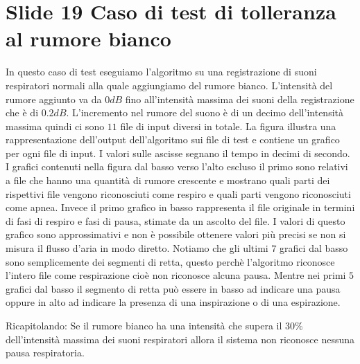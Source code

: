 \section{Slide 19 Caso di test di tolleranza al rumore bianco}


In questo caso di test eseguiamo l'algoritmo su una registrazione di suoni respiratori normali alla quale aggiungiamo del rumore bianco. 
L'intensit\`a del rumore aggiunto va da $0dB$ fino all'intensit\`a massima dei suoni della registrazione che \`e di $0.2dB$.
L'incremento nel rumore del suono \`e di un decimo dell'intensit\`a massima quindi ci sono $11$ file di input diversi in totale.
La figura  illustra una rappresentazione dell'output dell'algoritmo sui file di test e contiene un grafico per ogni file di input.
I valori sulle ascisse segnano il tempo in decimi di secondo.
I grafici contenuti nella figura dal basso verso l'alto escluso il primo sono relativi a file che hanno una quantit\`a di rumore crescente e mostrano quali parti dei rispettivi file vengono riconosciuti come respiro e quali parti vengono riconosciuti come apnea.
Invece il primo grafico in basso rappresenta il file originale in termini di fasi di respiro e fasi di pausa, stimate da un ascolto del file.
I valori di questo grafico sono approssimativi e non \`e possibile ottenere valori pi\`u precisi se non si misura il flusso d'aria in modo diretto.
Notiamo che gli ultimi $7$ grafici dal basso sono semplicemente dei segmenti di retta, questo perch\`e l'algoritmo riconosce l'intero file come respirazione cio\`e non riconosce alcuna pausa. 
Mentre nei primi $5$ grafici dal basso il segmento di retta pu\`o essere in basso ad indicare una pausa oppure in alto ad indicare la presenza di una inspirazione o di una espirazione.


Ricapitolando:
Se il rumore bianco ha una intensit\`a che supera il $30\%$ dell'intensit\`a massima dei suoni respiratori allora il sistema non riconosce nessuna pausa respiratoria.

